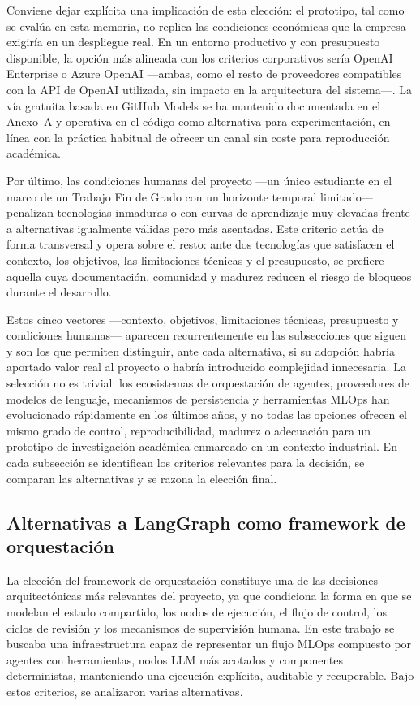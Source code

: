 \documentclass[12pt,a4paper]{article}
\theoremstyle{plain}
\begin{document}
Conviene dejar explícita una implicación de esta elección: el prototipo, tal como se evalúa en esta memoria, no replica las condiciones económicas que la empresa exigiría en un despliegue real. En un entorno productivo y con presupuesto disponible, la opción más alineada con los criterios corporativos sería OpenAI Enterprise o Azure OpenAI ---ambas, como el resto de proveedores compatibles con la API de OpenAI utilizada, sin impacto en la arquitectura del sistema---. La vía gratuita basada en GitHub Models se ha mantenido documentada en el Anexo~A y operativa en el código como alternativa para experimentación, en línea con la práctica habitual de ofrecer un canal sin coste para reproducción académica.

Por último, las condiciones humanas del proyecto ---un único estudiante en el marco de un Trabajo Fin de Grado con un horizonte temporal limitado--- penalizan tecnologías inmaduras o con curvas de aprendizaje muy elevadas frente a alternativas igualmente válidas pero más asentadas. Este criterio actúa de forma transversal y opera sobre el resto: ante dos tecnologías que satisfacen el contexto, los objetivos, las limitaciones técnicas y el presupuesto, se prefiere aquella cuya documentación, comunidad y madurez reducen el riesgo de bloqueos durante el desarrollo.

Estos cinco vectores ---contexto, objetivos, limitaciones técnicas, presupuesto y condiciones humanas--- aparecen recurrentemente en las subsecciones que siguen y son los que permiten distinguir, ante cada alternativa, si su adopción habría aportado valor real al proyecto o habría introducido complejidad innecesaria. La selección no es trivial: los ecosistemas de orquestación de agentes, proveedores de modelos de lenguaje, mecanismos de persistencia y herramientas MLOps han evolucionado rápidamente en los últimos años, y no todas las opciones ofrecen el mismo grado de control, reproducibilidad, madurez o adecuación para un prototipo de investigación académica enmarcado en un contexto industrial. En cada subsección se identifican los criterios relevantes para la decisión, se comparan las alternativas y se razona la elección final.


\subsection{Alternativas a LangGraph como framework de orquestación}
\label{sec:alt-langgraph}

La elección del framework de orquestación constituye una de las decisiones arquitectónicas más relevantes del proyecto, ya que condiciona la forma en que se modelan el estado compartido, los nodos de ejecución, el flujo de control, los ciclos de revisión y los mecanismos de supervisión humana. En este trabajo se buscaba una infraestructura capaz de representar un flujo MLOps compuesto por agentes con herramientas, nodos LLM más acotados y componentes deterministas, manteniendo una ejecución explícita, auditable y recuperable. Bajo estos criterios, se analizaron varias alternativas.
\end{document}
